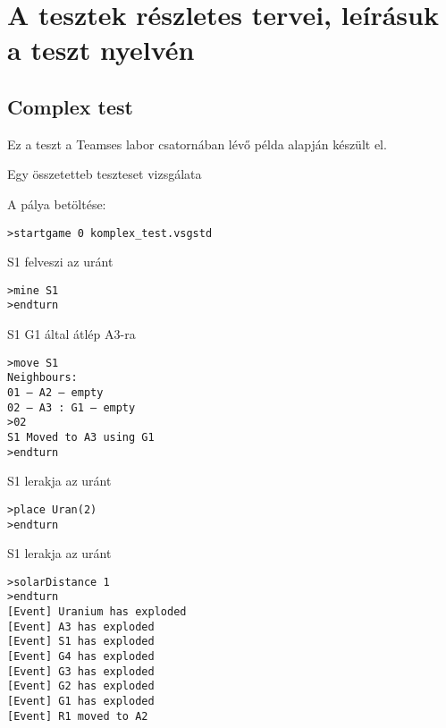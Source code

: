 \documentclass[../../projlab]{subfiles}
\begin{document}
\section{A tesztek részletes tervei, leírásuk a teszt nyelvén}

\subsection{Complex test}
\begin{test-case-description}
    Ez a teszt a Teamses labor csatornában lévő példa alapján készült el.
\end{test-case-description}
\begin{test-case-function}
    Egy összetetteb teszteset vizsgálata
\end{test-case-function}
\begin{test-case-input}
A pálya betöltése:
    \begin{verbatim}
>startgame 0 komplex_test.vsgstd
    \end{verbatim}

S1 felveszi az uránt
    \begin{verbatim}
>mine S1
>endturn
    \end{verbatim}

S1 G1 által átlép A3-ra
    \begin{verbatim}
>move S1
Neighbours:
01 – A2 – empty
02 – A3 : G1 – empty
>02
S1 Moved to A3 using G1
>endturn
    \end{verbatim}

S1 lerakja az uránt
    \begin{verbatim}
>place Uran(2)
>endturn        
    \end{verbatim}

S1 lerakja az uránt
    \begin{verbatim}
>solarDistance 1
>endturn
[Event] Uranium has exploded
[Event] A3 has exploded
[Event] S1 has exploded
[Event] G4 has exploded
[Event] G3 has exploded
[Event] G2 has exploded
[Event] G1 has exploded
[Event] R1 moved to A2        
    \end{verbatim}
\end{test-case-input}
\end{document}
